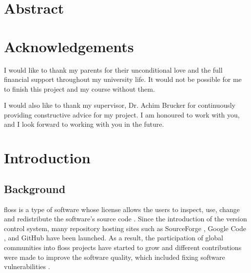 \documentclass[12pt, a4paper]{report}
\begin{document}
\newpage

\chapter*{Abstract}

\chapter*{Acknowledgements}
I would like to thank my parents for their unconditional love and the full financial support
throughout my university life. It would not be possible for me to finish this project and my course
without them.

I would also like to thank my supervisor, Dr. Achim Brucker for continuously providing constructive
advice for my project. I am honoured to work with you, and I look forward to working with you in the
future.

\newpage

\tableofcontents

\listoffigures

\listoftables

\lstlistoflistings

\newpage


\chapter{Introduction}
\section{Background}
\acrfull{floss} is a type of software whose license allows the users to inspect, use, change and
redistribute the software's source code \cite{crowston_2012}. Since the introduction of the version
control system, many repository hosting sites such as SourceForge \cite{sourceforge}, Google Code
\cite{google_code}, and GitHub \cite{github} have been launched. As a result, the participation of
global communities into \acrshort{floss} projects have started to grow and different contributions
were made to improve the software quality, which included fixing software vulnerabilities
\cite{dabbish_2012}.
\end{document}
